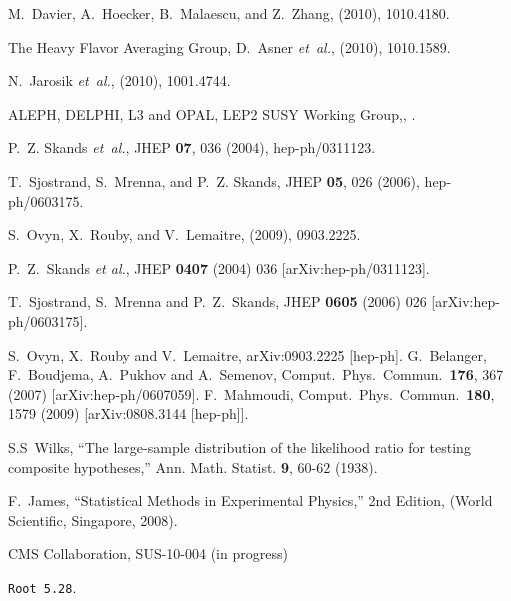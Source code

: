\begin{thebibliography}{10}
M.~Davier, A.~Hoecker, B.~Malaescu, and Z.~Zhang,
\newblock (2010), 1010.4180.

The Heavy Flavor Averaging Group, D.~Asner {\em et~al.},
\newblock (2010), 1010.1589.

N.~Jarosik {\em et~al.},
\newblock (2010), 1001.4744.

ALEPH, DELPHI, L3 and OPAL, {LEP2 SUSY Working Group,},
.

P.~Z. Skands {\em et~al.},
\newblock JHEP {\bf 07}, 036 (2004), hep-ph/0311123.

T.~Sjostrand, S.~Mrenna, and P.~Z. Skands,
\newblock JHEP {\bf 05}, 026 (2006), hep-ph/0603175.

S.~Ovyn, X.~Rouby, and V.~Lemaitre,
\newblock (2009), 0903.2225.

  P.~Z.~Skands {\it et al.},
  JHEP {\bf 0407} (2004) 036
  [arXiv:hep-ph/0311123].

  T.~Sjostrand, S.~Mrenna and P.~Z.~Skands,
  JHEP {\bf 0605} (2006) 026
  [arXiv:hep-ph/0603175].

  S.~Ovyn, X.~Rouby and V.~Lemaitre,
  arXiv:0903.2225 [hep-ph].
%
  G.~Belanger, F.~Boudjema, A.~Pukhov and A.~Semenov,
  Comput.\ Phys.\ Commun.\  {\bf 176}, 367 (2007)
  [arXiv:hep-ph/0607059].
%
  F.~Mahmoudi,
  Comput.\ Phys.\ Commun.\  {\bf 180}, 1579 (2009)
  [arXiv:0808.3144 [hep-ph]].
%

S.S~Wilks, ``The large-sample distribution of the likelihood ratio for testing composite hypotheses,'' Ann. Math. Statist. {\bf 9}, 60-62 (1938).
	
F.~James, ``Statistical Methods in Experimental Physics,''  2nd Edition, (World Scientific, Singapore, 2008).

CMS Collaboration, SUS-10-004 (in progress)

{\tt Root 5.28}.

\end{thebibliography}
